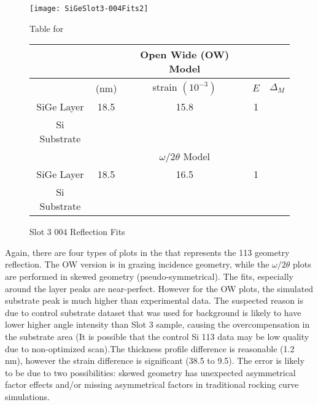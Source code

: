 \begin{figure}[ht]%
\caption{Slot 3 004 Reflection Fits}
\label{Slot3-004}
\begin{minipage}{0.85\linewidth}
\texttt{[image: SiGeSlot3-004Fits2]}
\end{minipage}
\begin{minipage}{\linewidth}
\centering
\vspace{10pt}
Table for \\
\vspace{5pt}
\begin{tabular}{c|cccc}
\hline
&&{Open Wide (OW) Model}	 \\
\hline
			&	(nm)	&	strain  $(10^{-3})$	&	$E$&  $\Delta_M$\\
\hline
SiGe Layer		&  	18.5	&     15.8	 & 1 & \textendash	\\
Si Substrate		&	\textemdash & \textemdash&\textemdash\ &\textemdash	\\
\hline
			& &$\omega/2\theta$ Model \\
\hline
SiGe Layer		&	18.5	& 16.5	& 1	&\textendash\ 	\\
Si Substrate		&	\textemdash & \textemdash&\textemdash\ &\textemdash
\end{tabular}
\end{minipage}
\end{figure}

Again,  there are four types of plots in the  that represents the 113 geometry reflection.  The OW version is in grazing incidence geometry, while the $\omega/2\theta$ plots are performed in skewed geometry (pseudo-symmetrical).  The fits, especially around the layer peaks are near-perfect.  However for the OW plots, the simulated substrate peak is much higher than experimental data.  The suspected reason is due to control substrate dataset that was used for background is likely to have lower higher angle intensity than Slot 3 sample, causing the overcompensation in the substrate area (It is possible that the control Si 113 data may be low quality due to non-optimized scan).The thickness profile difference is reasonable (1.2 nm), however the strain difference is significant (38.5 to 9.5).  The error is likely to be due to two possibilities:  skewed geometry has unexpected asymmetrical factor effects and/or missing asymmetrical factors in traditional rocking curve simulations.  

